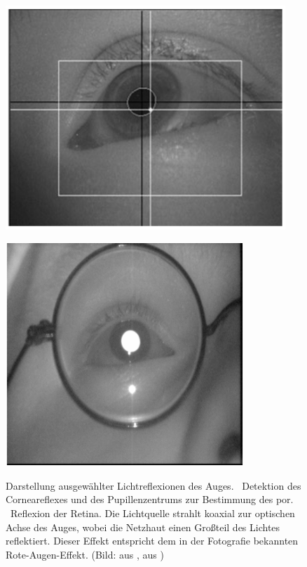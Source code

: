 \begin{figure}[!ht]
   \begin{minipage}[t]{.5\linewidth} 
      \centering 
      \includegraphics[width=0.94\textwidth]{bilder/grundlagen/Augenreflex.png}
  \label{fig:purkinje} 
   \end{minipage}%
   \hfill
   \begin{minipage}[t]{.5\linewidth} 
      \centering 
  \includegraphics[width=0.8\textwidth]{bilder/grundlagen/reflex.png} 
      \label{fig:reflex}
   \end{minipage}%
    \hfill
  \caption{Darstellung ausgewählter Lichtreflexionen des Auges. \textbf{}~Detektion des Corneareflexes und des Pupillenzentrums zur Bestimmung des \acl{por}. \textbf{}~Reflexion der Retina. Die Lichtquelle strahlt koaxial zur optischen Achse des Auges, wobei die Netzhaut einen Großteil des Lichtes reflektiert. Dieser Effekt entspricht dem in der Fotografie bekannten Rote-Augen-Effekt. (Bild: \textbf{} aus \cite{Majaranta2014}, \textbf{} aus \cite[Abb. 3]{Joos2003})}\label{fig:reflexpurkije} 
\end{figure} 

